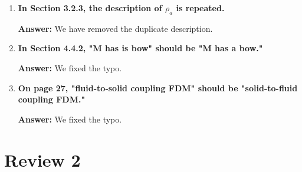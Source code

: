 \documentclass{article}
\newcommand{\answer}[1]{\textbf{\textcolor{answercolor}{Answer:}} \textcolor{answercolor}{#1}}
\begin{document}
\begin{enumerate}[label=\textbf{\arabic*.}]
	      \answer{We changed "standard gravity" to "gravitational acceleration."}

	\item \textbf{In Section 3.2.3, the description of $\rho_a$ is repeated.}

	      \answer{We have removed the duplicate description.}

	\item \textbf{In Section 4.4.2, "M has is bow" should be "M has a bow."}

	      \answer{We fixed the typo.}

	\item \textbf{On page 27, "fluid-to-solid coupling FDM" should be "solid-to-fluid coupling FDM."}

	      \answer{We fixed the typo.}
\end{enumerate}

\section*{Review 2}
\end{document}
